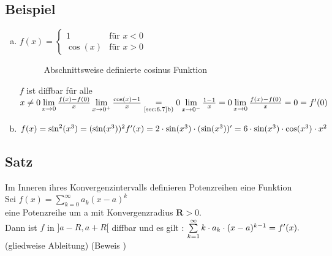 \subsection{Beispiel}
\begin{enumerate}[a)]
\item $f(x) = \begin{cases}
1 & \text{für }x < 0\\
\cos(x) & \text{für } x > 0
\end{cases}$\\
\begin{figure}[h!]
\centering
{}
\caption{Abschnittsweise definierte cosinus Funktion}
\end{figure}
$f$ ist diffbar für alle $ x \ne 0\\
\lim\limits_{x \to 0} \frac{f(x) - f(0)}{x}\\
\lim\limits_{x \to 0^+} \frac{\cos(x) -1}{x} \underset{\text{\ref{sec:6.7}b)}}{=} 0\\
\lim\limits_{x \to 0^-} \frac{1 -1 }{x} = 0\\
\lim\limits_{x \to 0} \frac{f(x) - f(0)}{x} = 0 = f'(0)$
\item $f(x) = \sin^2(x^3) = (\sin(x^3))^2\\
f'(x) = 2 \cdot \sin(x^3) \cdot (\sin(x^3))' = 6 \cdot \sin(x^3) \cdot \cos(x^3) \cdot x^2$\\
\end{enumerate}
\subsection[Satz: Potenzreihen und diverenzierbarkeit]{Satz}
Im Inneren ihres Konvergenzintervalls definieren Potenzreihen eine Funktion\\
Sei $f(x) = \sum\limits_{k = 0}^{\infty} a_k (x-a)^k$\\
eine Potenzreihe um a mit Konvergenzradius $\mathbf{R} > 0.$\\
Dann ist $f$ in $]a-R, a+R[$ diffbar und es gilt : $\sum\limits_{k =1}^{\infty} k \cdot a_k \cdot (x-a)^{k-1} = f'(x).$\\
\hfil (gliedweise Ableitung)\newline
\hfil (Beweis \cite{k7})
